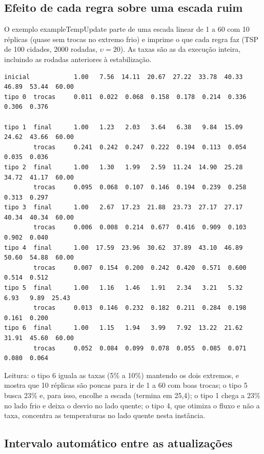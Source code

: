 \documentclass[10pt,a4paper]{article}
\newcommand{\code}[1]{{\ttfamily #1}}
\begin{document}
\subsection*{Efeito de cada regra sobre uma escada ruim}

O exemplo \code{exampleTempUpdate} parte de uma escada linear de 1 a 60 com 10 réplicas (quase sem trocas no extremo frio) e imprime o que cada regra faz (TSP de 100 cidades, 2000 rodadas, $\upsilon = 20$). As taxas são as da execução inteira, incluindo as rodadas anteriores à estabilização.

\begin{lstlisting}[style=saida]
inicial            1.00   7.56  14.11  20.67  27.22  33.78  40.33  46.89  53.44  60.00
tipo 0  trocas     0.011  0.022  0.068  0.158  0.178  0.214  0.336  0.306  0.376

tipo 1  final      1.00   1.23   2.03   3.64   6.38   9.84  15.09  24.62  43.66  60.00
        trocas     0.241  0.242  0.247  0.222  0.194  0.113  0.054  0.035  0.036
tipo 2  final      1.00   1.30   1.99   2.59  11.24  14.90  25.28  34.72  41.17  60.00
        trocas     0.095  0.068  0.107  0.146  0.194  0.239  0.258  0.313  0.297
tipo 3  final      1.00   2.67  17.23  21.88  23.73  27.17  27.17  40.34  40.34  60.00
        trocas     0.006  0.008  0.214  0.677  0.416  0.909  0.103  0.902  0.040
tipo 4  final      1.00  17.59  23.96  30.62  37.89  43.10  46.89  50.60  54.88  60.00
        trocas     0.007  0.154  0.200  0.242  0.420  0.571  0.600  0.514  0.512
tipo 5  final      1.00   1.16   1.46   1.91   2.34   3.21   5.32   6.93   9.89  25.43
        trocas     0.013  0.146  0.232  0.182  0.211  0.284  0.198  0.161  0.200
tipo 6  final      1.00   1.15   1.94   3.99   7.92  13.22  21.62  31.91  45.60  60.00
        trocas     0.052  0.084  0.099  0.078  0.055  0.085  0.071  0.080  0.064
\end{lstlisting}

Leitura: o tipo 6 iguala as taxas (5\% a 10\%) mantendo os dois extremos, e mostra que 10 réplicas são poucas para ir de 1 a 60 com boas trocas; o tipo 5 busca 23\% e, para isso, encolhe a escada (termina em 25,4); o tipo 1 chega a 23\% no lado frio e deixa o desvio no lado quente; o tipo 4, que otimiza o fluxo e não a taxa, concentra as temperaturas no lado quente nesta instância.

\subsection*{Intervalo automático entre as atualizações}
\end{document}
